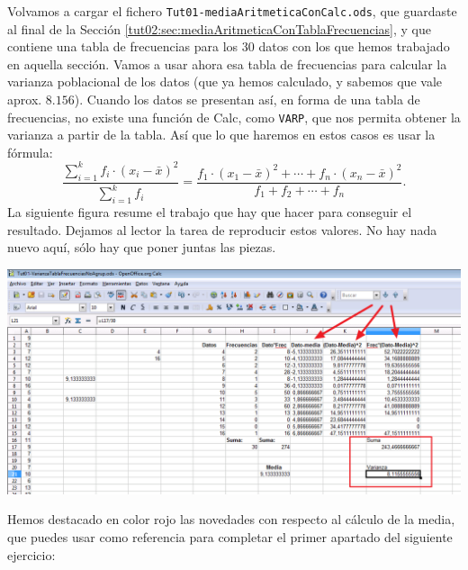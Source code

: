 \documentclass[10pt,a4paper]{article}\usepackage[]{graphicx}\usepackage[]{color}
\newcounter {cont01}
\begin{document}
Volvamos a cargar el fichero {\tt Tut01-mediaAritmeticaConCalc.ods}, que guardaste al final de la Sección \ref{tut02:sec:mediaAritmeticaConTablaFrecuencias}, y que contiene una tabla de frecuencias para los 30 datos con los que hemos trabajado en aquella sección. Vamos a usar ahora esa tabla de frecuencias para calcular la varianza poblacional de los datos (que ya hemos calculado, y sabemos que vale aprox. $8.156$). Cuando los datos se presentan así, en forma de una tabla de frecuencias, no existe una función de Calc, como {\tt VARP}, que nos permita obtener la varianza a partir de la tabla. Así que lo que haremos en estos casos es usar la fórmula:
\[
\dfrac{\displaystyle\sum_{i=1}^k f_i\cdot(x_i-\bar x)^2}{\displaystyle\sum_{i=1}^k f_i}=
\dfrac{f_1\cdot(x_1-\bar x)^2+\cdots+f_n\cdot(x_n-\bar x)^2}{f_1+f_2+\cdots+f_n}
.\]
La siguiente figura resume el trabajo que hay que hacer para conseguir el resultado. Dejamos al lector la tarea de reproducir estos valores. No hay nada nuevo aquí, sólo hay que poner juntas las piezas.
    \begin{center}
    \includegraphics[width=15.5cm]{../fig/Tut02-56.png}
    \end{center}
Hemos destacado en color rojo las novedades con respecto al cálculo de la media, que puedes usar como referencia para completar el primer apartado del siguiente ejercicio:
\end{document}
